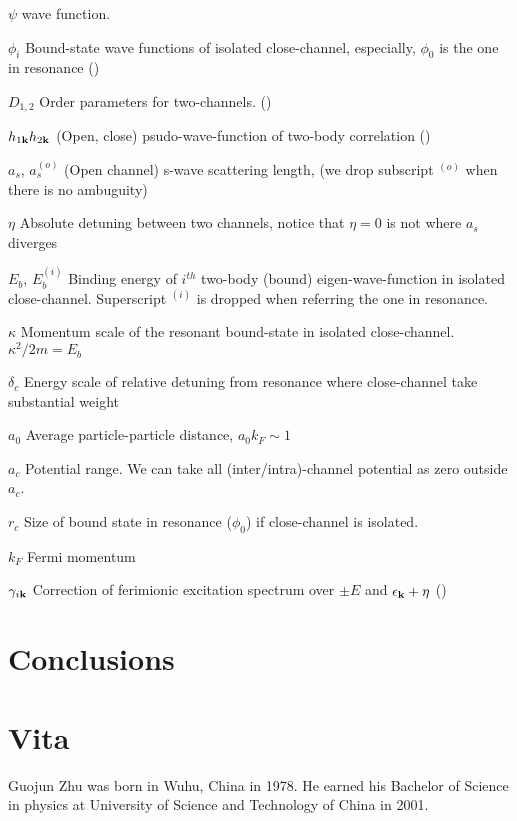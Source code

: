 \documentclass[edeposit,fullpage]{uiucthesis2009}
\begin{document}
\begin{symbollist}[0.7in]
\item[$\psi$] wave function.
\item[$\phi_{i}$] Bound-state wave functions of  isolated close-channel, especially, $\phi_{0}$ is the one in resonance (\pageref{eq:pathInt2:phi})
\item[$D_{1,2}$] Order parameters for two-channels. (\pageref{eq:pathInt2:Ddef})
\item[$h_{1\mathbf{k}} h_{2\mathbf{k}}$] (Open, close) psudo-wave-function of two-body correlation (\pageref{eq:pathInt2:h2})
\item[$a_{s}$, $a_{s}^{(o)}$] (Open channel) s-wave scattering length, (we drop subscript ${}^{(o)}$ when there is no ambuguity) 
\item[$\eta$] Absolute detuning between two channels, notice that $\eta=0$ is not where $a_{s}$ diverges
\item[$E_{b}$, $E_{b}^{(i)}$] Binding energy of $i^{th}$ two-body (bound) eigen-wave-function in isolated close-channel.  Superscript ${}^{(i)}$ is dropped when referring the one in resonance. 
\item[$\kappa$] Momentum scale of the resonant bound-state in isolated close-channel.  $\kappa^{2}/2m=E_{b}$
\item[$\delta_{c}$] Energy scale of relative detuning from resonance where close-channel take substantial weight
\item[$a_{0}$] Average particle-particle distance, $a_{0}k_{F}\sim1$
\item[$a_{c}$] Potential range.  We can take all (inter/intra)-channel potential as zero outside $a_{c}$.
\item[$r_{c}$] Size of bound state in resonance ($\phi_{0}$) if close-channel is isolated. 
\item[$k_{F}$] Fermi momentum
\item[$\gamma_{i\mathbf{k}}$] Correction of ferimionic excitation spectrum over $\pm{}E$ and $\epsilon_{\mathbf{k}}+\eta$ (\pageref{eq:pathInt2:xiExpand})
\end{symbollist}

\mainmatter




\chapter{Conclusions\label{ch:conclusion}}


\appendix

%



\backmatter



\chapter{Vita}

Guojun  Zhu was born in Wuhu, China in 1978.  He earned his Bachelor of Science in physics at University of Science and Technology of China in 2001.  
\end{document}
